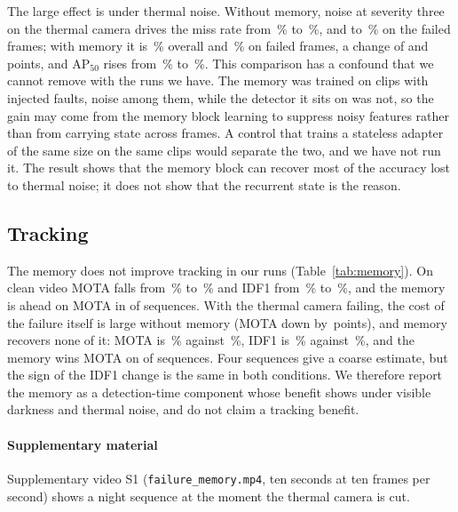 The large effect is under thermal noise. Without memory, noise at severity three on the thermal camera drives the miss rate from \memCleanImageAllMr{}\,\% to \memThermalNoiseImageAllMr{}\,\%, and to \memThermalNoiseImageFailedMr{}\,\% on the failed frames; with memory it is \memThermalNoiseMemoryAllMr{}\,\% overall and \memThermalNoiseMemoryFailedMr{}\,\% on failed frames, a change of \memChangeThermalNoiseAllMr{} and \memChangeThermalNoiseFailedMr{}\,points, and AP$_{50}$ rises from \memThermalNoiseImageAllApFifty{}\,\% to \memThermalNoiseMemoryAllApFifty{}\,\%. This comparison has a confound that we cannot remove with the runs we have. The memory was trained on clips with injected faults, noise among them, while the detector it sits on was not, so the gain may come from the memory block learning to suppress noisy features rather than from carrying state across frames. A control that trains a stateless adapter of the same size on the same clips would separate the two, and we have not run it. The result shows that the memory block can recover most of the accuracy lost to thermal noise; it does not show that the recurrent state is the reason.

\subsection{Tracking}
\label{sec:kaisttracking}
The memory does not improve tracking in our runs (Table~\ref{tab:memory}). On clean video MOTA falls from \trkCleanImageMota{}\,\% to \trkCleanMemoryMota{}\,\% and IDF1 from \trkCleanImageIdfOne{}\,\% to \trkCleanMemoryIdfOne{}\,\%, and the memory is ahead on MOTA in \trkCleanMemoryWinsMota{} of \trkSeqCount{} sequences. With the thermal camera failing, the cost of the failure itself is large without memory (MOTA down by \trkFaultCostImageMota{}\,points), and memory recovers none of it: MOTA is \trkThermalLostMemoryMota{}\,\% against \trkThermalLostImageMota{}\,\%, IDF1 is \trkThermalLostMemoryIdfOne{}\,\% against \trkThermalLostImageIdfOne{}\,\%, and the memory wins MOTA on \trkThermalLostMemoryWinsMota{} of \trkSeqCount{} sequences. Four sequences give a coarse estimate, but the sign of the IDF1 change is the same in both conditions. We therefore report the memory as a detection-time component whose benefit shows under visible darkness and thermal noise, and do not claim a tracking benefit.

\paragraph{Supplementary material}
Supplementary video S1 (\texttt{failure\_memory.mp4}, ten seconds at ten frames per second) shows a night sequence at the moment the thermal camera is cut.

